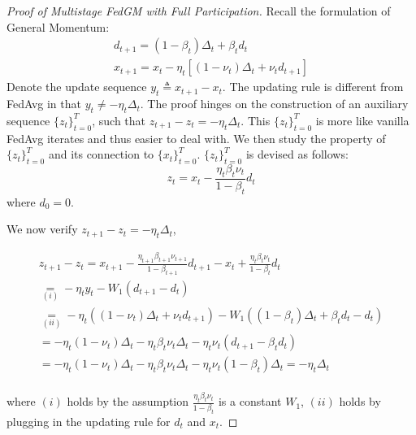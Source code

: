 \begin{proof}[Proof of Multistage FedGM with Full Participation]

Recall the formulation of General Momentum:
\begin{equation}
    \begin{gathered}
    d_{t+1}=\left(1-\beta_t\right)\Delta_t+\beta_t d_t\\
    x_{t+1}=x_t-\eta_t\left[\left(1-\nu_t\right)\Delta_t+\nu_t d_{t+1}\right]
\end{gathered}\nonumber
\end{equation}
Denote the update sequence $y_t\triangleq x_{t+1}-x_t$. The updating rule is different from FedAvg in that $y_t\ne -\eta_t \Delta_t$. The proof hinges on the construction of an auxiliary sequence $\{z_t\}_{t=0}^{T}$, such that $z_{t+1}-z_t= - \eta_t \Delta_t$. This $\{z_t\}_{t=0}^{T}$ is more like vanilla FedAvg iterates and thus easier to deal with. We then study the property of $\{z_t\}_{t=0}^{T}$ and its connection to $\{x_t\}_{t=0}^{T}$. $\{z_t\}_{t=0}^{T}$ is devised as follows:
\begin{equation}
\label{auxiliary_seq}
z_t= x_t-\frac{\eta_t\beta_t\nu_t}{1-\beta_t}d_{t}
\end{equation}
where $d_0=0$.

We now verify $z_{t+1}-z_t= - \eta_t \Delta_t$,

\begin{equation}
\begin{gathered}
z_{t+1}-z_t=x_{t+1}-\frac{\eta_{t+1}\beta_{t+1}\nu_{t+1}}{1-\beta_{t+1}} d_{t+1} - x_{t}+\frac{\eta_{t}\beta_{t}\nu_{t}}{1-\beta_{t}} d_t\\
\underset{(i)}{=}-\eta_t y_t-W_1(d_{t+1}-d_t)\\
\underset{(ii)}{=}-\eta_t\left(\left(1-\nu_t\right)\Delta_t+\nu_t d_{t+1}\right)-W_1\left(\left(1-\beta_t\right)\Delta_t+\beta_t d_t-d_t\right)\\
=-\eta_t\left(1-\nu_t\right)\Delta_t-\eta_t\beta_t\nu_t\Delta_t-\eta_t\nu_t\left(d_{t+1}-\beta_t d_t\right)\\
=-\eta_t\left(1-\nu_t\right)\Delta_t-\eta_t\beta_t\nu_t\Delta_t-\eta_t\nu_t\left(1-\beta_t\right)\Delta_t=-\eta_t\Delta_t\\
\end{gathered}\nonumber
\end{equation}

where $(i)$ holds by the assumption $\frac{\eta_{t}\beta_{t}\nu_{t}}{1-\beta_{t}}$ is a constant $W_1$, $(ii)$ holds by plugging in the updating rule for $d_t$ and $x_t$.


\end{proof}
